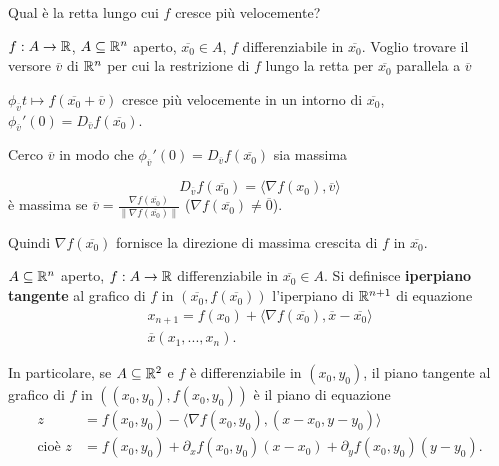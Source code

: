 Qual è la retta lungo cui $f$ cresce più velocemente?

\segnaposto %

$f:A \rightarrow\mathbb{R}$, $A\subseteq\mathbb{R}^n$ aperto, $\overline{x_0}\in A$, $f$ differenziabile in $\overline{x_0}$. Voglio trovare il versore $\overline{v}$ di $\mathbb{R}^n$ per cui la restrizione di $f$ lungo la retta per $\overline{x_0}$ parallela a $\overline{v}$

$\phi_{\overline{v}}t\mapsto f(\overline{x_0}+\overline{v})$ cresce più velocemente in un intorno di $\overline{x_0}$, $\phi_{\overline{v}}'(0)=D_{\overline{v}}f(\overline{x_0})$.

Cerco $\overline{v}$ in modo che $\phi_{\overline{v}}'(0)=D_{\overline{v}}f(\overline{x_0})$ sia massima

$$D_{\overline{v}}f(\overline{x_0})=\langle \nabla f(x_0),\overline{v} \rangle$$ è massima se $\overline{v}=\frac{\nabla f(\overline{x_0})}{\|\nabla f(\overline{x_0})\|}$ ($\nabla f(\overline{x_0})\neq \overline{0}$).

Quindi $\nabla f(\overline{x_0})$ fornisce la direzione di massima crescita di $f$ in $\overline{x_0}$.

\segnaposto %


\begin{definition}
	$A\subseteq\mathbb{R}^n$ aperto, $f:A \rightarrow \mathbb{R}$ differenziabile in $\overline{x_0}\in A$. Si definisce \textbf{iperpiano tangente} al grafico di $f$ in $(\overline{x_0},f(\overline{x_0}))$ l'iperpiano di $\mathbb{R}^{n+1}$ di equazione
	\begin{gather*}
		x_{n+1}=f(x_0)+\langle \nabla f(\overline{x_0}), \overline{x}-\overline{x_0} \rangle
		\\
		\overline{x}(x_1,...,x_n).
	\end{gather*}
	
	In particolare, se $A \subseteq \mathbb{R}^2$ e $f$ è differenziabile in $(x_0,y_0)$, il piano tangente al grafico di $f$ in $((x_0,y_0),f(x_0,y_0))$ è il piano di equazione
	\begin{align*}
		z&=f(x_0,y_0)-\langle \nabla f(x_0,y_0),(x-x_0,y-y_0) \rangle
		\\
		\text{cioè }z&=f(x_0,y_0)+\partial_xf(x_0,y_0)(x-x_0)+\partial_yf(x_0,y_0)(y-y_0).
	\end{align*}
\end{definition}


